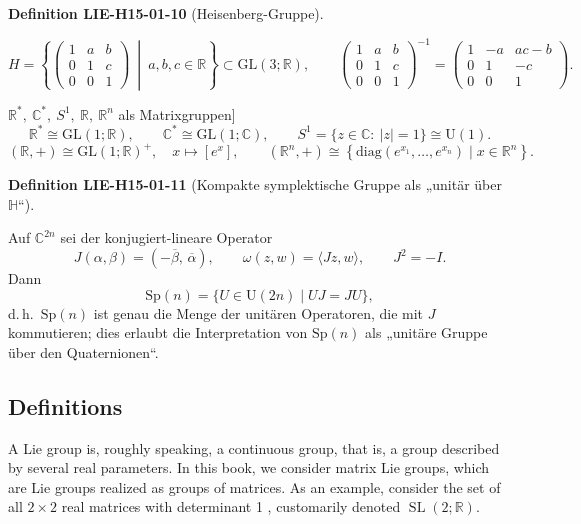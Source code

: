\documentclass[10pt, letterpaper]{article}
\newcommand{\R}{\mathbb{R}}
\newcommand{\C}{\mathbb{C}}
\newcommand{\GL}{\mathrm{GL}}
\newcommand{\Sp}{\mathrm{Sp}}
\newcommand{\U}{\mathrm{U}}
\newcommand{\CustomHeading}[3]{%
  \par\medskip\noindent%
  \textbf{#1 #2} \textnormal{(#3)}.\enskip%
}
\newenvironment{DEF}[2]{\begin{unitbox}\CustomHeading{Definition}{#1}{#2}}{\end{unitbox}}
\begin{document}
\begin{DEF}{LIE-H15-01-10}{Heisenberg-Gruppe}
\[
H=\left\{
\begin{pmatrix}
1 & a & b\\
0 & 1 & c\\
0 & 0 & 1
\end{pmatrix}
\ \middle|\ a,b,c\in\R
\right\}\subset \GL(3;\R),\qquad
\begin{pmatrix}
1 & a & b\\
0 & 1 & c\\
0 & 0 & 1
\end{pmatrix}^{-1}
=
\begin{pmatrix}
1 & -a & ac-b\\
0 & 1 & -c\\
0 & 0 & 1
\end{pmatrix}.
\]

$\R^*,\ \C^*,\ S^1,\ \R,\ \R^n$ als Matrixgruppen]
\[
\R^* \cong \GL(1;\R),\qquad \C^* \cong \GL(1;\C),\qquad S^1=\{z\in\C:\ |z|=1\}\cong \U(1).
\]
\[
(\R,+)\cong \GL(1;\R)^+,\quad x\mapsto [e^x],\qquad
(\R^n,+)\cong\left\{\mathrm{diag}(e^{x_1},\dots,e^{x_n})\mid x\in\R^n\right\}.
\]
\end{DEF}


\begin{DEF}{LIE-H15-01-11}{Kompakte symplektische Gruppe als „unitär über $\mathbb{H}$“}
Auf $\C^{2n}$ sei der konjugiert-lineare Operator
\[
J(\alpha,\beta)=(-\overline{\beta},\,\overline{\alpha}),\qquad
\omega(z,w)=\langle Jz,w\rangle,\qquad J^2=-I.
\]
Dann
\[
\Sp(n)=\{U\in \U(2n)\mid UJ=JU\},
\]
d.\,h.\ $\Sp(n)$ ist genau die Menge der unitären Operatoren, die mit $J$ kommutieren; dies erlaubt die Interpretation von $\Sp(n)$ als „unitäre Gruppe über den Quaternionen“.
\end{DEF}







\subsection*{Definitions}
A Lie group is, roughly speaking, a continuous group, that is, a group described by several real parameters. In this book, we consider matrix Lie groups, which are Lie groups realized as groups of matrices. As an example, consider the set of all $2 \times 2$ real matrices with determinant 1 , customarily denoted $\operatorname{SL}(2 ; \mathbb{R})$. 
\end{document}

